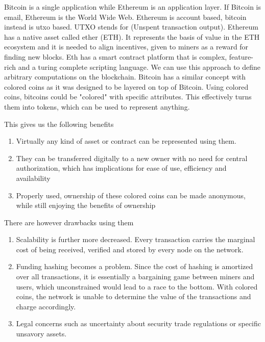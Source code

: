 \documentclass{article}
\begin{document}
Bitcoin is a single application while Ethereum is an application layer. If Bitcoin is email, Ethereum is the World Wide Web.
Ethereum is account based, bitcoin instead is utxo based. UTXO stends for (Unspent transaction output). Ethereum has a native asset called ether (ETH). It represents the basis of value in the ETH ecosystem and it is needed to align incentives, given to miners as a reward for finding new blocks. Eth has a smart contract platform that is complex, feature-rich and a turing complete scripting language. We can use this approach to define arbitrary computations on the blockchain. \newline Bitcoin has a similar concept with colored coins as it was designed to be layered on top of Bitcoin. Using colored coins, bitcoins could be "colored" with specific attributes. This effectively turns them into tokens, which can be used to represent anything. \newline

This gives us the following benefits

\begin{enumerate}
    \item Virtually any kind of asset or contract can be represented using them.
    \item They can be transferred digitally to a new owner with no need for central authorization, which has implications for ease of use, efficiency and availability
    \item Properly used, ownership of these colored coins can be made anonymous, while still enjoying the benefits of ownership
\end{enumerate}

There are however drawbacks using them

\begin{enumerate}
    \item Scalability is further more decreased. Every transaction carries the marginal cost of being received, verified and stored by every node on the network.
    \item Funding hashing becomes a problem. Since the cost of hashing is amortized over all transactions, it is essentially a bargaining game between miners and users, which unconstrained would lead to a race to the bottom. With colored coins, the network is unable to determine the value of the transactions and charge accordingly.
    \item Legal concerns such as uncertainty about security trade regulations or specific unsavory assets.
\end{enumerate}
\end{document}
